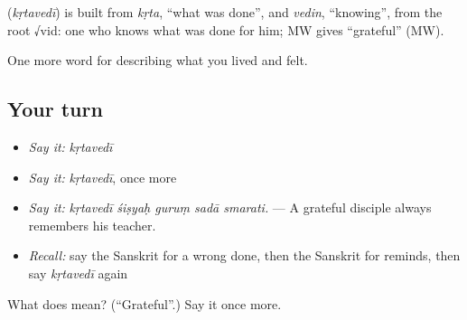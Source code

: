 \begin{cousinweb}
\textbf{} (\emph{kṛtavedī}) is built from \emph{kṛta}, \textquotedblleft{}what was done\textquotedblright{}, and \emph{vedin}, \textquotedblleft{}knowing\textquotedblright{}, from the root √vid: one who knows what was done for him; MW gives \textquotedblleft{}grateful\textquotedblright{} (MW).
\end{cousinweb}

\begin{grammarlens}[title={What you've built}]
One more word for describing what you lived and felt.
\end{grammarlens}

\subsection*{Your turn}
\begin{itemize}
\raggedright
  \item \emph{Say it:} \emph{kṛtavedī}
  \item \emph{Say it:} \emph{kṛtavedī}, once more
  \item \emph{Say it:} \emph{kṛtavedī śiṣyaḥ guruṃ sadā smarati.} — A grateful disciple always remembers his teacher.
  \item \emph{Recall:} say the Sanskrit for a wrong done, then the Sanskrit for reminds, then say \emph{kṛtavedī} again
\end{itemize}

\begin{tcolorbox}[breakable,colback=teal!4,colframe=teal!35!black,title={Before you move on}]
What does  mean? (\textquotedblleft{}Grateful\textquotedblright{}.) Say it once more.
\end{tcolorbox}
